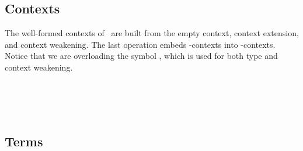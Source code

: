 \subsection{Contexts}
The well-formed contexts of \GTT\ are built from the empty context, context extension, and context weakening. The last operation embeds -contexts into -contexts. 
Notice that we are overloading the symbol , which is used for both type and context weakening.
\begin{AgdaAlign}
\begin{code}%
\>[0]\AgdaSpace{}%
\AgdaSpace{}%
\AgdaSymbol{:}\AgdaSpace{}%
\AgdaSpace{}%
\AgdaSpace{}%
\AgdaSpace{}%
\<%
\\
\>[0][@{}l@{\AgdaIndent{0}}]%
\>[2]\AgdaSpace{}%
\AgdaSymbol{:}\AgdaSpace{}%
\AgdaSpace{}%
\AgdaSymbol{\{}\AgdaSymbol{\}}\AgdaSpace{}%
\AgdaSpace{}%
\AgdaSpace{}%
\<%
\\
%
\>[2]\AgdaOperator{\AgdaInductiveConstructor{\AgdaUnderscore{},\AgdaUnderscore{}}}\AgdaSpace{}%
\AgdaSymbol{:}\AgdaSpace{}%
\AgdaSpace{}%
\AgdaSymbol{\{}\AgdaSymbol{\}}\AgdaSpace{}%
\AgdaSpace{}%
\AgdaSpace{}%
\AgdaSpace{}%
\AgdaSpace{}%
\AgdaSpace{}%
\AgdaSpace{}%
\AgdaSpace{}%
\AgdaSpace{}%
\<%
\\
%
\>[2]\AgdaSpace{}%
\AgdaSymbol{:}\AgdaSpace{}%
\AgdaSpace{}%
\AgdaSpace{}%
\AgdaSpace{}%
\AgdaSpace{}%
\<%
\end{code}
\end{AgdaAlign}


\subsection{Terms}


